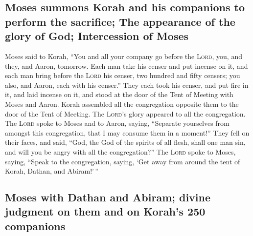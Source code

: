 \hypertarget{moses-summons-korah-and-his-companions-to-perform-the-sacrifice-the-appearance-of-the-glory-of-god-intercession-of-moses}{%
\subsection{Moses summons Korah and his companions to perform the
sacrifice; The appearance of the glory of God; Intercession of
Moses}\label{moses-summons-korah-and-his-companions-to-perform-the-sacrifice-the-appearance-of-the-glory-of-god-intercession-of-moses}}

 Moses said to Korah, ``You and all your company go
before the \textsc{Lord}, you, and they, and Aaron, tomorrow.
 Each man take his censer and put incense on it, and each
man bring before the \textsc{Lord} his censer, two hundred and fifty
censers; you also, and Aaron, each with his censer.'' 
They each took his censer, and put fire in it, and laid incense on it,
and stood at the door of the Tent of Meeting with Moses and Aaron.
 Korah assembled all the congregation opposite them to
the door of the Tent of Meeting. The \textsc{Lord}'s glory appeared to
all the congregation.  The \textsc{Lord} spoke to Moses
and to Aaron, saying,  ``Separate yourselves from amongst
this congregation, that I may consume them in a moment!''
 They fell on their faces, and said, ``God, the God of
the spirits of all flesh, shall one man sin, and will you be angry with
all the congregation?''  The \textsc{Lord} spoke to
Moses, saying,  ``Speak to the congregation, saying, `Get
away from around the tent of Korah, Dathan, and Abiram!'\,''

\hypertarget{moses-with-dathan-and-abiram-divine-judgment-on-them-and-on-korahs-250-companions}{%
\subsection{Moses with Dathan and Abiram; divine judgment on them and on
Korah's 250
companions}\label{moses-with-dathan-and-abiram-divine-judgment-on-them-and-on-korahs-250-companions}}


